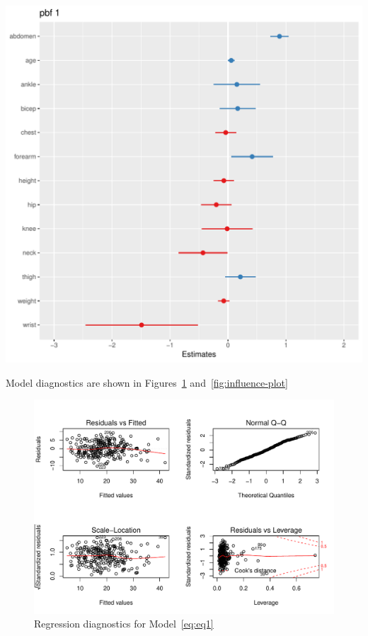 \documentclass[11pt,letter]{article}\usepackage[]{graphicx}\usepackage[]{color}
\makeatletter
\def\maxwidth{ %
  \ifdim\Gin@nat@width>\linewidth
    \linewidth
  \else
    \Gin@nat@width
  \fi
}
\newenvironment{knitrout}{}{} %
\makeatother
\begin{document}
\begin{knitrout}
\color{fgcolor}
\includegraphics[width=\maxwidth]{figure/fit1-plot-1} 

\end{knitrout}

\FloatBarrier

Model diagnostics are shown in Figures~\ref{fig:diagnostics} and~\ref{fig:influence-plot}

\begin{knitrout}
\color{fgcolor}\begin{figure}[h]

{\centering \includegraphics[width=\maxwidth]{figure/diagnostics-1} 

}

\caption{Regression diagnostics for Model~\eqref{eq:eq1}}\label{fig:diagnostics}
\end{figure}


\end{knitrout}
\end{document}
